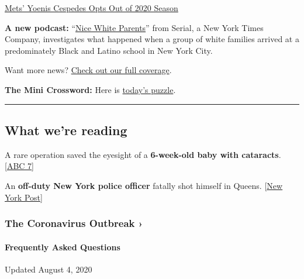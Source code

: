 \href{https://www.nytimes3xbfgragh.onion/2020/08/02/sports/baseball/Yoenis-cespedes-opt-out-rule.html}{Mets'
Yoenis Cespedes Opts Out of 2020 Season}

\textbf{A new podcast:}
``\href{https://www.nytimes3xbfgragh.onion/2020/07/30/podcasts/nice-white-parents-serial.html}{Nice
White Parents}'' from Serial, a New York Times Company, investigates
what happened when a group of white families arrived at a predominately
Black and Latino school in New York City.

Want more news?
\href{https://www.nytimes3xbfgragh.onion/section/nyregion}{Check out our
full coverage}.

\textbf{The Mini Crossword:} Here is
\href{https://www.nytimes3xbfgragh.onion/crosswords/game/mini}{today's
puzzle}.

\begin{center}\rule{0.5\linewidth}{\linethickness}\end{center}

\hypertarget{what-were-reading}{%
\subsection{What we're reading}\label{what-were-reading}}

A rare operation saved the eyesight of a \textbf{6-week-old baby with
cataracts}. {[}\href{https://abc7ny.com/6340873/}{ABC 7}{]}

An \textbf{off-duty New York police officer} fatally shot himself in
Queens.
{[}\href{https://nypost.com/2020/08/02/off-duty-nypd-cop-shoots-himself-in-the-head-in-queens-suicide/}{New
York Post}{]}

\href{https://www.nytimes3xbfgragh.onion/news-event/coronavirus?action=click\&pgtype=Article\&state=default\&region=MAIN_CONTENT_3\&context=storylines_faq}{}

\hypertarget{the-coronavirus-outbreak-}{%
\subsubsection{The Coronavirus Outbreak
›}\label{the-coronavirus-outbreak-}}

\hypertarget{frequently-asked-questions}{%
\paragraph{Frequently Asked
Questions}\label{frequently-asked-questions}}

Updated August 4, 2020

